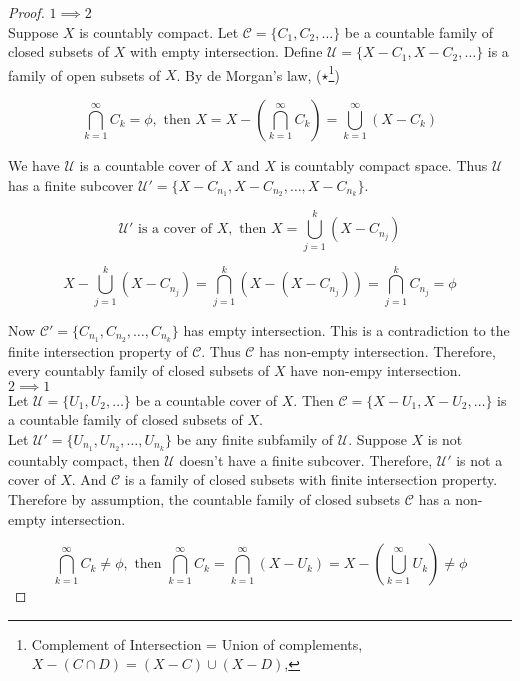 \begin{proof}
	$1 \implies 2$\\
	Suppose $X$ is countably compact.
	Let $\mathcal{C} = \{C_1,C_2,\dotsc \}$ be a countable family of closed subsets of $X$ with empty intersection.
	Define $\mathcal{U} = \{X-C_1, X-C_2, \dotsc \}$ is a family of open subsets of $X$.
	By de Morgan's law, ($\star$\footnote{Complement of Intersection = Union of complements, $X - (C \cap D) = (X-C) \cup (X-D)$, })

	\[\bigcap_{k = 1}^\infty C_k = \phi, \text{ then } X =  X - \left(\bigcap_{k = 1}^\infty C_k\right) = \bigcup_{k = 1}^\infty (X-C_k)\]

	We have $\mathcal{U}$ is a countable cover of $X$ and $X$ is countably compact space.
	Thus $\mathcal{U}$ has a finite subcover $\mathcal{U}' = \{X-C_{n_1},X-C_{n_2},\dots ,X-C_{n_k}\}$.

	\[ \mathcal{U}' \text{ is a cover of } X, \text{ then } X = \bigcup_{j = 1}^k \left( X-C_{n_j} \right)\]

	\[X - \bigcup_{j = 1}^k \left( X-C_{n_j} \right) = \bigcap_{j = 1}^k \left( X - \left( X - C_{n_j} \right) \right) = \bigcap_{j = 1}^k C_{n_j} = \phi \]

	Now $\mathcal{C}' = \{ C_{n_1}, C_{n_2}, \dots, C_{n_k}\}$ has empty intersection.
	This is a contradiction to the finite intersection property of $\mathcal{C}$.
	Thus $\mathcal{C}$ has non-empty intersection.
	Therefore, every countably family of closed subsets of $X$ have non-empy intersection.\\

	$2 \implies 1$\\

	Let $\mathcal{U}=\{ U_1, U_2, \dotsc \}$ be a countable cover of $X$.
	Then $\mathcal{C} = \{ X-U_1,X-U_2,\dotsc \}$ is a countable family of closed subsets of $X$.\\

	Let $\mathcal{U}'= \{ U_{n_1},U_{n_2},\dots ,U_{n_k}\}$ be any finite subfamily of $\mathcal{U}$.
	Suppose $X$ is not countably compact, then $\mathcal{U}$ doesn't have a finite subcover.
	Therefore, $\mathcal{U}'$ is not a cover of $X$.
	And $\mathcal{C}$ is a family of closed subsets with finite intersection property.\\

	Therefore by assumption, the countable family of closed subsets $\mathcal{C}$ has a non-empty intersection.

	\[ \bigcap_{k=1}^\infty C_k \ne \phi, \text{ then } \bigcap_{k=1}^\infty C_k = \bigcap_{k=1}^\infty \left( X - U_k \right) = X - \left( \bigcup_{k=1}^\infty U_k \right) \ne \phi \]


\end{proof}
